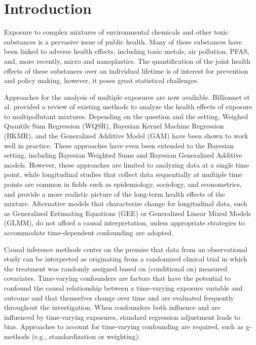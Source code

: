 
\section*{Introduction}

Exposure to complex mixtures of environmental chemicals and other toxic substances is a pervasive issue of public health. Many of these substances have been linked to adverse health effects, including toxic metals,\cite{efsa_arsenic_2009,grau_perez_2017,grau_perez_2018,oliver_williams_2018,zhao_2022} air pollution, PFAS, and, more recently, micro and nanoplastics. The quantification of the joint health effects of these substances over an individual lifetime is of interest for prevention and policy making, however, it poses great statistical challenges.

Approaches for the analysis of multiple exposures are now available. Billionnet et al.\cite{billionnet_2012} provided a review of existing methods to analyze the health effects of exposure to multipollutant mixtures. Depending on the question and the setting, Weighed Quantile Sum Regression (WQSR),\cite{carrico_wqs_2015} Bayesian Kernel Machine Regression (BKMR),\cite{bobb_bkmr_2015} and the Generalized Additive Model (GAM)\cite{hastie_tibshirani_1995} have been shown to work well in practice. These approaches have even been extended to the Bayesian setting, including Bayesian Weighted Sums\cite{colicino_bwqs_2020} and Bayesian Generalized Additive models. However, these approaches are limited to analyzing data at a single time point, while longitudinal studies that collect data sequentially at multiple time points are common in fields such as epidemiology, sociology, and econometrics, and provide a more realistic picture of the long-term health effects of the mixture. Alternative models that characterize change for longitudinal data, such as Generalized Estimating Equations (GEE) or Generalized Linear Mixed Models (GLMM), do not afford a causal interpretation, unless appropriate strategies to accommodate time-dependent confounding are adopted.

Causal inference methods center on the premise that data from an observational study can be interpreted as originating from a randomized clinical trial in which the treatment was randomly assigned based on (conditional on) measured covariates.\cite{rubin_1974} Time-varying confounders are factors that have the potential to confound the causal relationship between a time-varying exposure variable and outcome and that themselves change over time and are evaluated frequently throughout the investigation. When confounders both influence and are influenced by time-varying exposures, standard regression adjustment leads to bias.\cite{hernan_robins_2020} Approaches to account for time-varying confounding are required, such as g-methods (e.g., standardization or weighting).\cite{naimi_2017}

